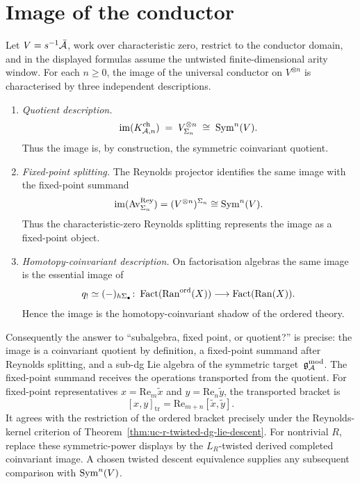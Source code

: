 \section{Image of the conductor}
\label{sec:uc-image}

\begin{theorem}
\label{thm:uc-trinity}
\ClaimStatusProvedHere
Let $V=s^{-1}\bar{\mathcal{A}}$, work over characteristic zero, restrict to the
conductor domain, and in the displayed formulas assume the untwisted
finite-dimensional arity window. For each $n\geq 0$, the image of the
universal conductor on $V^{\otimes n}$ is characterised by three
independent descriptions.
\begin{enumerate}
\item[\textup{(Q)}] \emph{Quotient description.}
 \[
 \operatorname{im}(K_{\mathcal{A},n}^{\mathrm{ch}})
 \;=\;
 V^{\otimes n}_{\Sigma_n}
 \;\cong\;
 \operatorname{Sym}^n(V).
 \]
 Thus the image is, by construction, the symmetric coinvariant
 quotient.
\item[\textup{(F)}] \emph{Fixed-point splitting.}
 The Reynolds projector identifies the same image with the fixed-point
 summand
 \[
 \operatorname{im}(\operatorname{Av}^{\mathrm{Rey}}_{\Sigma_n})
 =
 (V^{\otimes n})^{\Sigma_n}
 \cong
 \operatorname{Sym}^n(V).
 \]
 Thus the characteristic-zero Reynolds splitting represents the image
 as a fixed-point object.
\item[\textup{(H)}] \emph{Homotopy-coinvariant description.}
 On factorisation algebras the same image is the essential image of
 \[
 q_!\simeq(-)_{h\Sigma_\bullet}
 \colon
 \operatorname{Fact}(\operatorname{Ran}^{\mathrm{ord}}(X))\longrightarrow \operatorname{Fact}(\operatorname{Ran}(X)).
 \]
 Hence the image is the homotopy-coinvariant shadow of the ordered
 theory.
\end{enumerate}
Consequently the answer to ``subalgebra, fixed point, or quotient?''
is precise: the image is a coinvariant quotient by definition, a
fixed-point summand after Reynolds splitting, and a sub-dg Lie algebra
of the symmetric target~$\mathfrak{g}_{\mathcal{A}}^{\mathrm{mod}}$.  The fixed-point summand receives the
operations transported from the quotient.  For fixed-point
representatives $x=\mathrm{Re}_m\widetilde x$ and
$y=\mathrm{Re}_n\widetilde y$, the transported bracket is
\[
[x,y]_{\mathrm{tr}}
=\mathrm{Re}_{m+n}[\widetilde x,\widetilde y].
\]
It agrees with the restriction of the ordered bracket precisely under
the Reynolds-kernel criterion of
Theorem~\ref{thm:uc-r-twisted-dg-lie-descent}.
For nontrivial $R$, replace these symmetric-power displays by the
$L_R$-twisted derived completed coinvariant image.  A chosen twisted
descent equivalence supplies any subsequent comparison with
$\operatorname{Sym}^n(V)$.
\end{theorem}

